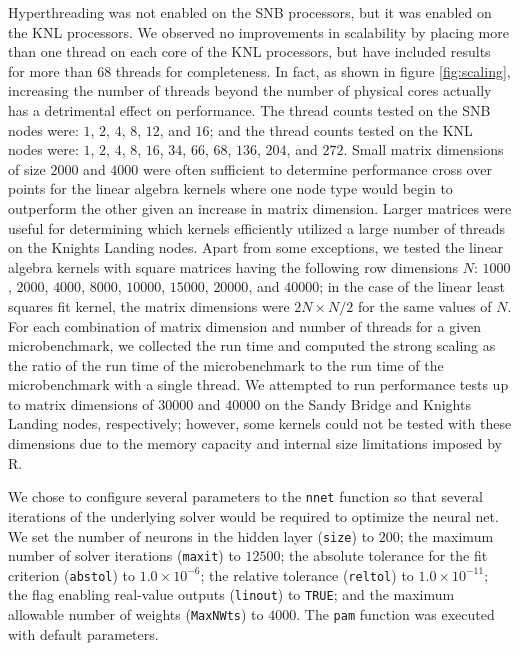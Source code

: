 Hyperthreading was not enabled on the SNB processors, but it was enabled on the KNL
processors. We observed no improvements in scalability by placing more than one thread on
each core of the KNL processors, but have included results for more than 68 threads for
completeness. In fact, as shown in figure \ref{fig:scaling}, increasing the number of
threads beyond the number of physical cores actually has a detrimental effect on
performance. The thread counts tested on the SNB nodes were: $1$, $2$, $4$, $8$, $12$, and
$16$; and the thread counts tested on the KNL nodes were: $1$, $2$, $4$, $8$, $16$, $34$,
$66$, $68$, $136$, $204$, and $272$. Small matrix dimensions of size $2000$ and $4000$
were often sufficient to determine performance cross over points for the linear algebra kernels
where one node type would begin to outperform the other given an increase in matrix
dimension. Larger matrices were useful for determining which kernels efficiently utilized
a large number of threads on the Knights Landing nodes. Apart from some exceptions, we
tested the linear algebra kernels with square matrices having the following row dimensions $N$:
$1000$, $2000$, $4000$, $8000$, $10000$, $15000$, $20000$, and $40000$; in the case of the
linear least squares fit kernel, the matrix dimensions were $2N \times N/2$ for the same values
of $N$. For each combination of matrix dimension and number of threads for a given
microbenchmark, we collected the run time and computed the strong scaling as the ratio of
the run time of the microbenchmark to the run time of the microbenchmark with a single
thread. We attempted to run performance tests up to matrix dimensions of $30000$ and
$40000$ on the Sandy Bridge and Knights Landing nodes, respectively; however, some kernels
could not be tested with these dimensions due to the memory capacity and internal size
limitations imposed by R.

We chose to configure several parameters to the \texttt{nnet} function so that
  several iterations of the underlying solver would be required to optimize
  the neural net.
We set the number of neurons in the hidden layer (\texttt{size}) to $200$;
  the maximum number of solver iterations (\texttt{maxit}) to $12500$;
  the absolute tolerance for the fit criterion (\texttt{abstol}) to $1.0\times 10^{-6}$;
  the relative tolerance (\texttt{reltol}) to $1.0\times 10^{-11}$;
  the flag enabling real-value outputs (\texttt{linout}) to \texttt{TRUE}; and
  the maximum allowable number of weights (\texttt{MaxNWts}) to $4000$.
The \texttt{pam} function was executed with default parameters.

